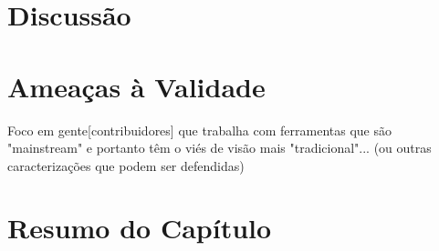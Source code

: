\section{Discussão}
\label{sec:sug_melhoria_discussao}

\section{Ameaças à Validade}
\label{sec:sug_melhoria_ameacas}

Foco em gente[contribuidores] que trabalha com ferramentas que são "mainstream"
e portanto têm o viés de visão mais "tradicional"...  (ou outras caracterizações
que podem ser defendidas)

\section{Resumo do Capítulo}
\label{sec:sug_melhoria_resumo}
